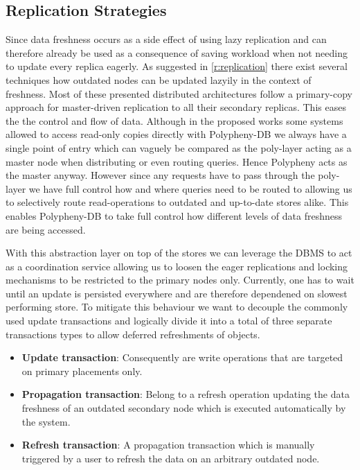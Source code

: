 
\subsection{Replication Strategies}
\label{sec:replication_strategy}
Since data freshness occurs as a side effect of using lazy replication and can therefore already
be used as a consequence of saving workload when not needing to update every replica eagerly.
As suggested in \ref{r:replication} there exist several techniques how outdated nodes can be updated lazyily in the context of freshness.
Most of these presented distributed architectures follow a primary-copy approach for master-driven replication to all their secondary replicas.
This eases the the control and flow of data. Although in the proposed works some systems allowed to access read-only copies directly
with Polypheny-DB we always have a single point of entry which can vaguely be compared as the poly-layer acting as a master node
when distributing or even routing queries. Hence Polypheny acts as the master anyway. However since any requests have to pass through the poly-layer
we have full control how and where queries need to be routed to allowing us to selectively route read-operations to outdated and up-to-date stores alike.
This enables Polypheny-DB to take full control how different levels of data freshness are being accessed.

With this abstraction layer on top of the stores we can leverage the DBMS to act as a coordination service allowing us to loosen the eager replications and 
locking mechanisms to be restricted to the primary nodes only. Currently, one has to wait until an update is persisted everywhere and are therefore
dependened on slowest performing store.
To mitigate this behaviour we want to decouple the commonly used update transactions and logically divide it into a total of three separate transactions types
to allow deferred refreshments of objects.
\begin{itemize}
    \item \textbf{Update transaction}: Consequently are write operations that are targeted on primary placements only.
    \item \textbf{Propagation transaction}: Belong to a refresh operation updating the data freshness of an outdated secondary node which is 
    executed automatically by the system.
    \item \textbf{Refresh transaction}: A propagation transaction which is manually triggered by a user to refresh the data on an arbitrary outdated node.
\end{itemize}


